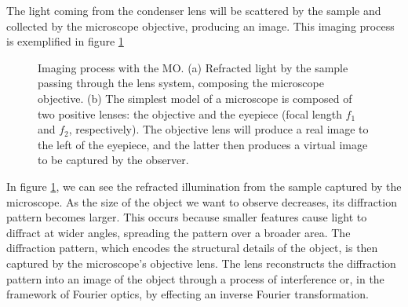 \documentclass[letterpaper,12pt,oneside]{book}
\begin{document}
The light coming from the condenser lens will be scattered by the sample and collected by the microscope objective, producing an image. This imaging process is exemplified in figure \ref{imagingprocess}
\begin{figure}[H]
    \centering
     \qquad
    \caption{Imaging process with the MO. (a) Refracted light by the sample passing through the lens system, composing the microscope objective. (b) The simplest model of a microscope is composed of two positive lenses: the objective and the eyepiece (focal length $f_1$ and $f_2$, respectively). The objective lens will produce a real image to the left of the eyepiece, and the latter then produces a virtual image to be captured by the observer. }
    \label{imagingprocess}%
\end{figure}
In figure \ref{imagingprocess}, we can see the refracted illumination from the sample captured by the microscope. As the size of the object we want to observe decreases, its diffraction pattern becomes larger. This occurs because smaller features cause light to diffract at wider angles, spreading the pattern over a broader area. The diffraction pattern, which encodes the structural details of the object, is then captured by the microscope's objective lens. The lens reconstructs the diffraction pattern into an image of the object through a process of interference or, in the framework of Fourier optics, by effecting an inverse Fourier transformation. \\
\end{document}
